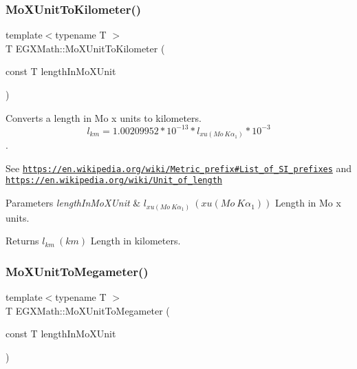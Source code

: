 \subsubsection{\texorpdfstring{Mo\+X\+Unit\+To\+Kilometer()}{MoXUnitToKilometer()}}
{\footnotesize\ttfamily template$<$typename T $>$ \\
T E\+G\+X\+Math\+::\+Mo\+X\+Unit\+To\+Kilometer (\begin{DoxyParamCaption}\item[{const T}]{length\+In\+Mo\+X\+Unit }\end{DoxyParamCaption})}



Converts a length in Mo x units to kilometers. \[ l_{km}=1.00209952*10^{-13} * l_{xu(Mo\ K\alpha_1)} * 10^{-3} \]. 

See \href{https://en.wikipedia.org/wiki/Metric_prefix#List_of_SI_prefixes}{\tt https\+://en.\+wikipedia.\+org/wiki/\+Metric\+\_\+prefix\#\+List\+\_\+of\+\_\+\+S\+I\+\_\+prefixes} and \href{https://en.wikipedia.org/wiki/Unit_of_length}{\tt https\+://en.\+wikipedia.\+org/wiki/\+Unit\+\_\+of\+\_\+length} 
\begin{DoxyParams}{Parameters}
{\em length\+In\+Mo\+X\+Unit} & $ l_{xu(Mo\ K\alpha_1)}\ (xu(Mo\ K\alpha_1))$ Length in Mo x units. \\
\hline
\end{DoxyParams}
\begin{DoxyReturn}{Returns}
$ l_{km}\ (km)$ Length in kilometers. 
\end{DoxyReturn}
\mbox{\label{group___e_g_x_math-_conversions-_length_conversions-_non-_s_i-_mo_x_unit-_s_i_ga97f86b6fb3faf5d48cacf99d7aa309d4}} 
\subsubsection{\texorpdfstring{Mo\+X\+Unit\+To\+Megameter()}{MoXUnitToMegameter()}}
{\footnotesize\ttfamily template$<$typename T $>$ \\
T E\+G\+X\+Math\+::\+Mo\+X\+Unit\+To\+Megameter (\begin{DoxyParamCaption}\item[{const T}]{length\+In\+Mo\+X\+Unit }\end{DoxyParamCaption})}



